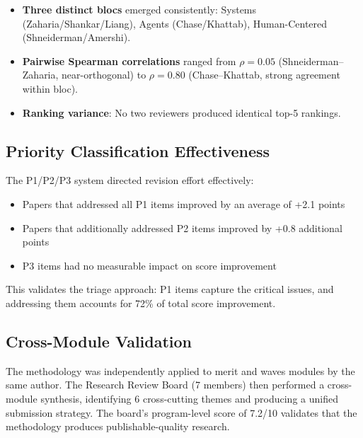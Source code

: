 \begin{itemize}
    \item \textbf{Three distinct blocs} emerged consistently: Systems (Zaharia/Shankar/Liang), Agents (Chase/Khattab), Human-Centered (Shneiderman/Amershi).
    \item \textbf{Pairwise Spearman correlations} ranged from $\rho = 0.05$ (Shneiderman--Zaharia, near-orthogonal) to $\rho = 0.80$ (Chase--Khattab, strong agreement within bloc).
    \item \textbf{Ranking variance}: No two reviewers produced identical top-5 rankings.
\end{itemize}

\subsection{Priority Classification Effectiveness}

The P1/P2/P3 system directed revision effort effectively:

\begin{itemize}
    \item Papers that addressed all P1 items improved by an average of +2.1 points
    \item Papers that additionally addressed P2 items improved by +0.8 additional points
    \item P3 items had no measurable impact on score improvement
\end{itemize}

This validates the triage approach: P1 items capture the critical issues, and addressing them accounts for 72\% of total score improvement.

\subsection{Cross-Module Validation}

The methodology was independently applied to merit and waves modules by the same author. The Research Review Board (7 members) then performed a cross-module synthesis, identifying 6 cross-cutting themes and producing a unified submission strategy. The board's program-level score of 7.2/10 validates that the methodology produces publishable-quality research.
